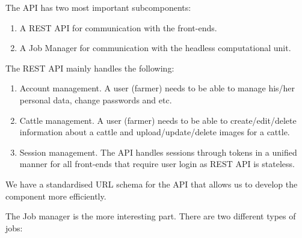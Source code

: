 The API has two most important subcomponents:

\begin{enumerate}
	\item A REST API for communication with the front-ends.
	\item A Job Manager for communication with the headless computational unit.
\end{enumerate}

The REST API mainly handles the following:

\begin{enumerate}
	\item Account management. A user (farmer) needs to be able to manage his/her personal data, change passwords and etc.
	\item Cattle management. A user (farmer) needs to be able to create/edit/delete information about a cattle and upload/update/delete images for a cattle.
	\item Session management. The API handles sessions through tokens in a unified manner for all front-ends that require user login as REST API is stateless.
\end{enumerate}

We have a standardised URL schema for the API that allows us to develop the component more efficiently.

The Job manager is the more interesting part. There are two different types of jobs:

